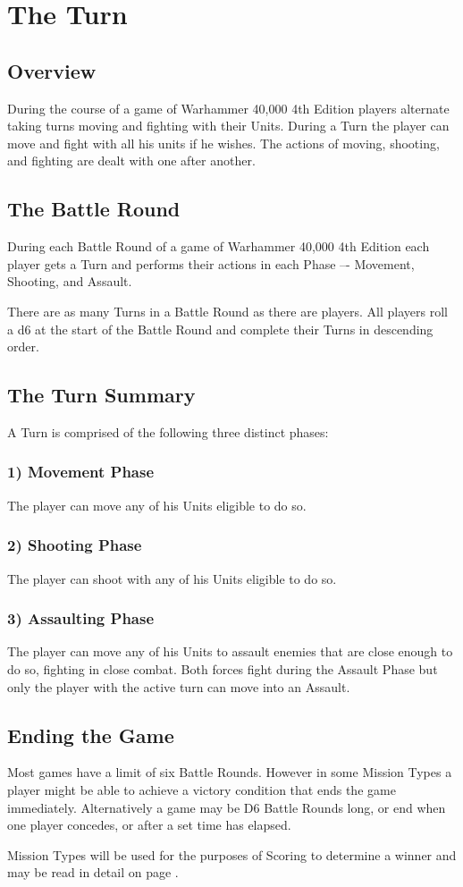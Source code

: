 
\chapter{The Turn}


\section{Overview}
During the course of a game of Warhammer 40,000 4th Edition
players alternate taking turns moving and fighting with their Units.
During a Turn the player can move and fight with all his units if he
wishes. The actions of moving, shooting, and fighting are dealt with
one after another.

\section{The Battle Round}
During each Battle Round of a game of Warhammer 40,000 4th
Edition each player gets a Turn and performs their actions in each
Phase –- Movement, Shooting, and Assault.

There are as many Turns in a Battle Round as there are players. All
players roll a d6 at the start of the Battle Round and complete their
Turns in descending order.


\section{The Turn Summary}
A Turn is comprised of the following three distinct phases:

\subsection{1) Movement Phase}
The player can move any of his Units eligible to do so.

\subsection{2) Shooting Phase}
The player can shoot with any of his Units eligible to do so.

\subsection{3) Assaulting Phase}
The player can move any of his Units to assault enemies that are
close enough to do so, fighting in close combat. Both forces fight
during the Assault Phase but only the player with the active turn
can move into an Assault.

\section{Ending the Game}
Most games have a limit of six Battle Rounds. However in some
Mission Types a player might be able to achieve a victory condition
that ends the game immediately. Alternatively a game may be D6
Battle Rounds long, or end when one player concedes, or after a set
time has elapsed.

Mission Types will be used for the purposes of Scoring to
determine a winner and may be read in detail on page \pageref{sec:missions}.
